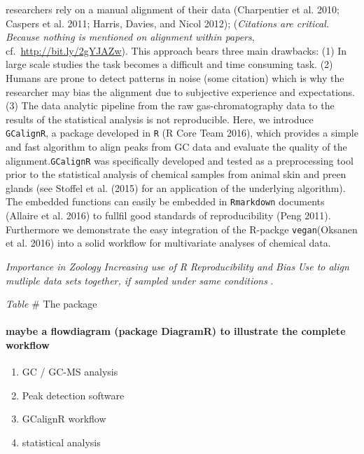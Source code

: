 \documentclass[]{article}
\providecommand{\tightlist}{%
  \setlength{\itemsep}{0pt}\setlength{\parskip}{0pt}}
\let\oldparagraph\paragraph
\renewcommand{\paragraph}[1]{\oldparagraph{#1}\mbox{}}
\begin{document}
researchers rely on a manual alignment of their data (Charpentier et al.
2010; Caspers et al. 2011; Harris, Davies, and Nicol 2012);
(\emph{Citations are critical. Because nothing is mentioned on alignment
within papers}, cf.~\url{http://bit.ly/2gYJAZw}). This approach bears
three main drawbacks: (1) In large scale studies the task becomes a
difficult and time consuming task. (2) Humans are prone to detect
patterns in noise (some citation) which is why the researcher may bias
the alignment due to subjective experience and expectations. (3) The
data analytic pipeline from the raw gas-chromatography data to the
results of the statistical analysis is not reproducible. Here, we
introduce \texttt{GCalignR}, a package developed in \texttt{R} (R Core
Team 2016), which provides a simple and fast algorithm to align peaks
from GC data and evaluate the quality of the alignment.\texttt{GCalignR}
was specifically developed and tested as a preprocessing tool prior to
the statistical analysis of chemical samples from animal skin and preen
glands (see Stoffel et al. (2015) for an application of the underlying
algorithm). The embedded functions can easily be embedded in
\texttt{Rmarkdown} documents (Allaire et al. 2016) to fullfil good
standards of reproducibility (Peng 2011). Furthermore we demonstrate the
easy integration of the R-packge \texttt{vegan}(Oksanen et al. 2016)
into a solid workflow for multivariate analyses of chemical data.

\emph{Importance in Zoology} \emph{Increasing use of R}
\emph{Reproducibility and Bias} \emph{Use to align mutliple data sets
together, if sampled under same conditions} .

\emph{Table} \# The package

\paragraph{maybe a flowdiagram (package DiagramR) to illustrate the
complete
workflow}\label{maybe-a-flowdiagram-package-diagramr-to-illustrate-the-complete-workflow}

\begin{enumerate}
\def\labelenumi{\arabic{enumi}.}
\tightlist
\item
  GC / GC-MS analysis
\item
  Peak detection software
\item
  GCalignR workflow
\item
  statistical analysis
\end{enumerate}
\end{document}
